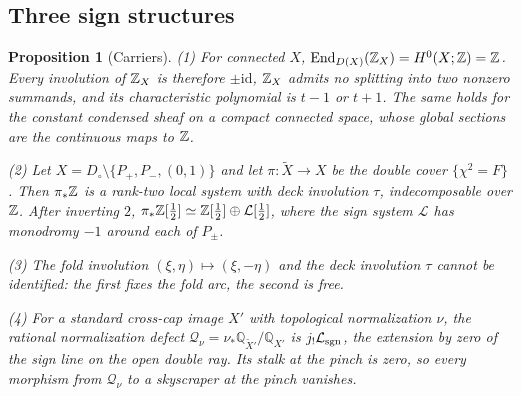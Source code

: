 \documentclass[11pt]{article}
\newtheorem{proposition}[theorem]{Proposition}
\theoremstyle{definition}\newtheorem{definition}[theorem]{Definition}
\theoremstyle{remark}\newtheorem{remark}[theorem]{Remark}
\newcommand{\Q}{\mathbb Q}\newcommand{\T}{\mathbb T}
\begin{document}
\subsection{Three sign structures}
\begin{proposition}[Carriers]\label{prop:carrier}
(1) For connected $X$, $\operatorname{End}_{D(X)}(\mathbb Z_X)=H^0(X;\mathbb Z)=\mathbb Z$. Every involution of
$\mathbb Z_X$ is therefore $\pm\mathrm{id}$, $\mathbb Z_X$ admits no splitting into two
nonzero summands, and its characteristic polynomial is $t-1$ or $t+1$. The same
holds for the constant condensed sheaf on a compact connected space, whose
global sections are the continuous maps to $\mathbb Z$.

(2) Let $X=D_\circ\setminus\{P_+,P_-,(0,1)\}$ and let $\pi:\widetilde X\to X$ be
the double cover $\{\chi^2=F\}$. Then $\pi_*\mathbb Z$ is a rank-two local system with
deck involution $\tau$, indecomposable over $\mathbb Z$. After inverting $2$,
$\pi_*\mathbb Z[\frac12]\simeq\mathbb Z[\frac12]\oplus\mathcal L[\frac12]$, where the sign
system $\mathcal L$ has monodromy $-1$ around each of $P_\pm$.

(3) The fold involution $(\xi,\eta)\mapsto(\xi,-\eta)$ and the deck involution
$\tau$ cannot be identified: the first fixes the fold arc, the second is free.

(4) For a standard cross-cap image $X'$ with topological normalization $\nu$,
the rational normalization defect
$\mathcal Q_\nu=\nu_*\Q_{\widetilde X'}/\Q_{X'}$ is $j_!\mathcal L_{\rm sgn}$,
the extension by zero of the sign line on the open double ray. Its stalk at the
pinch is zero, so every morphism from $\mathcal Q_\nu$ to a skyscraper at the
pinch vanishes.
\end{proposition}
\end{document}
